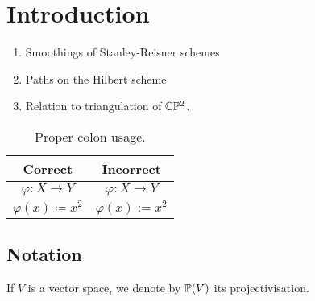 \chapter{Introduction}
\label{sec:intro}

\begin{enumerate}
    \item Smoothings of Stanley-Reisner schemes
    \item Paths on the Hilbert scheme
    \item Relation to triangulation of $\C \P^2$.
\end{enumerate}


\begin{table}[htbp]
    \centering
    \begin{tabular}{cc}
        \toprule
        \textbf{Correct}               & \textbf{Incorrect} \\
        \midrule
        \( \varphi \colon X \to Y \)   & \( \varphi : X \to Y \)  \\[0.5ex]
        \( \varphi(x) \coloneqq x^2 \) & \( \varphi(x) := x^2 \)  \\
        \bottomrule
    \end{tabular}
    \caption[Colons]{Proper colon usage.}
\end{table}

\section{Notation}

If $V$ is a vector space, we denote by $\P(V)$ its projectivisation.